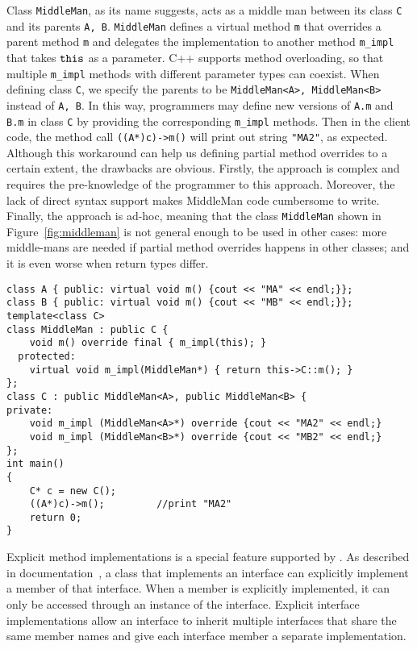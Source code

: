 Class \texttt{MiddleMan}, as its name suggests, acts as a middle man between its class \texttt{C} and its parents \texttt{A, B}. \texttt{MiddleMan} defines a virtual method \texttt{m} that overrides a parent method \texttt{m} and delegates the implementation to another method \texttt{m\_impl} that takes $\texttt{this}$ as a parameter. C++ supports method overloading, so that multiple \texttt{m\_impl} methods with different parameter types can coexist. When defining class \texttt{C}, we specify the parents to be \texttt{MiddleMan<A>, MiddleMan<B>} instead of \texttt{A, B}. In this way, programmers may define new versions of \texttt{A.m} and \texttt{B.m} in class \texttt{C} by providing the corresponding \texttt{m\_impl} methods. Then in the client code, the method call \texttt{((A*)c)->m()} will print out string \texttt{"MA2"}, as expected. Although this workaround can help us defining partial method overrides to a certain extent, the drawbacks are obvious. Firstly, the approach is complex and requires the pre-knowledge of the programmer to this approach. Moreover, the lack of direct syntax support makes MiddleMan code cumbersome to write. Finally, the approach is ad-hoc, meaning that the class \texttt{MiddleMan} shown in Figure~\ref{fig:middleman} is not general enough to be used in other cases: more middle-mans are needed if partial method overrides happens in other classes; and it is even worse when return types differ. 

\begin{figure*}[t]
\saveSpaceFig
\begin{lstlisting}
class A { public: virtual void m() {cout << "MA" << endl;}};
class B { public: virtual void m() {cout << "MB" << endl;}};
template<class C>
class MiddleMan : public C {
    void m() override final { m_impl(this); }
  protected:
    virtual void m_impl(MiddleMan*) { return this->C::m(); }
};
class C : public MiddleMan<A>, public MiddleMan<B> { 
private:
    void m_impl (MiddleMan<A>*) override {cout << "MA2" << endl;}
    void m_impl (MiddleMan<B>*) override {cout << "MB2" << endl;}
};
int main()
{
    C* c = new C();
    ((A*)c)->m();         //print "MA2"
    return 0;
}
\end{lstlisting}
\caption{The \emph{MiddleMan} approach.}
\label{fig:middleman}
\saveSpaceFig
\end{figure*}

Explicit method implementations is a special feature supported by
\csharp{}. As described in \csharp{} documentation~\cite{csharpdoc}, a
class that implements an interface can explicitly implement a member
of that interface. When a member is explicitly implemented, it can
only be accessed through an instance of the interface. Explicit
interface implementations allow an interface to inherit multiple 
interfaces that share the same member names and give each interface
member a separate implementation. 

